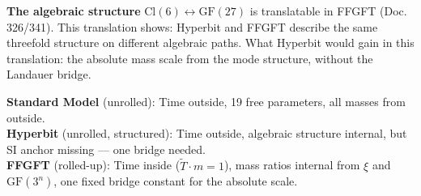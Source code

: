 \textbf{The algebraic structure} $\mathrm{Cl}(6) \leftrightarrow
\mathrm{GF}(27)$ is translatable in FFGFT (Doc.\,326/341). This
translation shows: Hyperbit and FFGFT describe the same
threefold structure on different algebraic paths. 
What Hyperbit would gain in this translation: the absolute
mass scale from the mode structure, without the Landauer bridge.

\begin{keyresult}[Doc.\,307]
\textbf{Standard Model} (unrolled): Time outside, 19 free parameters,
all masses from outside.\\[4pt]
\textbf{Hyperbit} (unrolled, structured): Time outside, algebraic
structure internal, but SI anchor missing --- one bridge needed.\\[4pt]
\textbf{FFGFT} (rolled-up): Time inside ($\tilde{T}\cdot m = 1$),
mass ratios internal from $\xi$ and $\mathrm{GF}(3^n)$,
one fixed bridge constant for the absolute scale.
\end{keyresult}